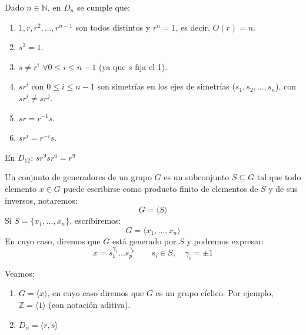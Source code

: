 \begin{prop}
    Dado $n\in \mathbb{N}$, en $D_n$ se cumple que:
    \begin{enumerate}
        \item $1,r,r^2,\ldots,r^{n-1}$ son todos distintos y $r^n =1$, es decir, $O(r)=n$.
        \item $s^2 = 1$.
        \item $s\neq r^i$ $\forall 0 \leq i \leq n-1$ (ya que $s$ fija el 1).
        \item $sr^i$ con $0\leq i\leq n-1$ son simetrías en los ejes de simetrías ($s_1,s_2,\ldots,s_n$), con $sr^i \neq sr^j$.
        \item $sr = r^{-1}s$.
        \item $sr^i = r^{-i}s$.
    \end{enumerate}
\end{prop}

\begin{ejemplo}
    En $D_{12}$: $sr^9sr^6 = r^9$
\end{ejemplo}

\begin{definicion}
    Un conjunto de generadores de un grupo $G$ es un subconjunto $S\subseteq G$ tal que todo elemento $x\in G$ puede escribirse como producto finito de elementos de $S$ y de sus inversos, notaremos:
    \begin{equation*}
        G = \langle S \rangle 
    \end{equation*}
    Si $S = \{x_1,\ldots,x_n\}$, escribiremos:
    \begin{equation*}
        G = \langle x_1,\ldots,x_n \rangle 
    \end{equation*}
    En cuyo caso, diremos que $G$ está generado por $S$ y podremos expresar:
    \begin{equation*}
        x = s_1^{\gamma_1}\ldots s_p^{\gamma_p} \qquad s_i \in S, \quad \gamma_i = \pm 1
    \end{equation*}
\end{definicion}

\begin{ejemplo}
    Veamos:
    \begin{enumerate}
        \item $G=\langle x \rangle $, en cuyo caso diremos que $G$ es un grupo cíclico.
            Por ejemplo, $\mathbb{Z} = \langle 1 \rangle $ (con notación aditiva).
        \item $D_n = \langle r,s \rangle $
    \end{enumerate}
\end{ejemplo}

